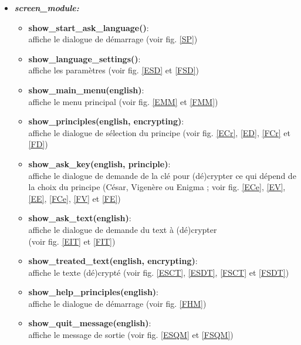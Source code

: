 \documentclass[a4paper,12pt,abstracton,titlepage]{scrartcl}
\begin{document}
\begin{itemize}
\item \textit{\textbf{screen\_module:}}\vspace{0.2cm}
\begin{itemize}
\item \textbf{show\_start\_ask\_language()}:\\
affiche le dialogue de démarrage (voir fig. \ref{SP})\\
\item \textbf{show\_language\_settings()}:\\
affiche les paramètres (voir fig. \ref{ESD} et \ref{FSD})\\
\item \textbf{show\_main\_menu(english)}:\\
affiche le menu principal (voir fig. \ref{EMM} et \ref{FMM})\\
\item \textbf{show\_principles(english, encrypting)}:\\
affiche le dialogue de sélection du principe (voir fig. \ref{ECr}, \ref{ED}, \ref{FCr} et \ref{FD})\\
\item \textbf{show\_ask\_key(english, principle)}:\\
affiche le dialogue de demande de la clé pour (dé)crypter ce qui dépend de la choix du principe (César, Vigenère ou Enigma ; voir fig. \ref{ECe}, \ref{EV}, \ref{EE}, \ref{FCe}, \ref{FV} et \ref{FE})\\
\item \textbf{show\_ask\_text(english)}:\\
affiche le dialogue de demande du text à (dé)crypter\\(voir fig. \ref{EIT} et \ref{FIT})\\
\item \textbf{show\_treated\_text(english, encrypting)}:\\
affiche le texte (dé)crypté (voir fig. \ref{ESCT}, \ref{ESDT}, \ref{FSCT} et \ref{FSDT})\\
\item \textbf{show\_help\_principles(english)}:\\
affiche le dialogue de démarrage (voir fig. \ref{FHM})\\
\item \textbf{show\_quit\_message(english)}:\\
affiche le message de sortie (voir fig. \ref{ESQM} et \ref{FSQM})\\
\end{itemize}\vspace{0.3cm}


\end{itemize}
\end{document}
